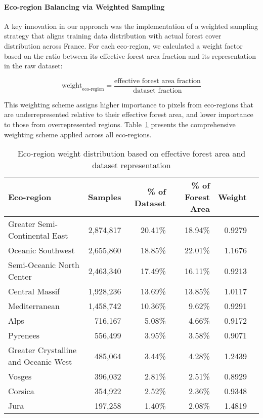 \paragraph{Eco-region Balancing via Weighted Sampling}
A key innovation in our approach was the implementation of a weighted sampling strategy that aligns training data distribution with actual forest cover distribution across France. For each eco-region, we calculated a weight factor based on the ratio between its effective forest area fraction and its representation in the raw dataset:

\begin{equation}
    \text{weight}_{\text{eco-region}} = \frac{\text{effective forest area fraction}}{\text{dataset fraction}}
\end{equation}

This weighting scheme assigns higher importance to pixels from eco-regions that are underrepresented relative to their effective forest area, and lower importance to those from overrepresented regions. Table~\ref{tab:eco_region_weights} presents the comprehensive weighting scheme applied across all eco-regions.

\begin{table}[h]
\centering
\caption{Eco-region weight distribution based on effective forest area and dataset representation}
\label{tab:eco_region_weights}
\begin{tabular}{lrrrrr}
\hline
\textbf{Eco-region} & \textbf{Samples} & \textbf{\% of Dataset} & \textbf{\% of Forest Area} & \textbf{Weight} \\
\hline
Greater Semi-Continental East & 2,874,817 & 20.41\% & 18.94\% & 0.9279 \\
Oceanic Southwest & 2,655,860 & 18.85\% & 22.01\% & 1.1676 \\
Semi-Oceanic North Center & 2,463,340 & 17.49\% & 16.11\% & 0.9213 \\
Central Massif & 1,928,236 & 13.69\% & 13.85\% & 1.0117 \\
Mediterranean & 1,458,742 & 10.36\% & 9.62\% & 0.9291 \\
Alps & 716,167 & 5.08\% & 4.66\% & 0.9172 \\
Pyrenees & 556,499 & 3.95\% & 3.58\% & 0.9071 \\
Greater Crystalline and Oceanic West & 485,064 & 3.44\% & 4.28\% & 1.2439 \\
Vosges & 396,032 & 2.81\% & 2.51\% & 0.8929 \\
Corsica & 354,922 & 2.52\% & 2.36\% & 0.9348 \\
Jura & 197,258 & 1.40\% & 2.08\% & 1.4819 \\
\hline
\end{tabular}
\end{table}

